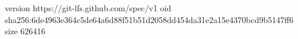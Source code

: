 version https://git-lfs.github.com/spec/v1
oid sha256:6de4963e364c5de64a6d88f51b51d2058dd454da31e2a15e4370bcd9b5147ff6
size 626416
